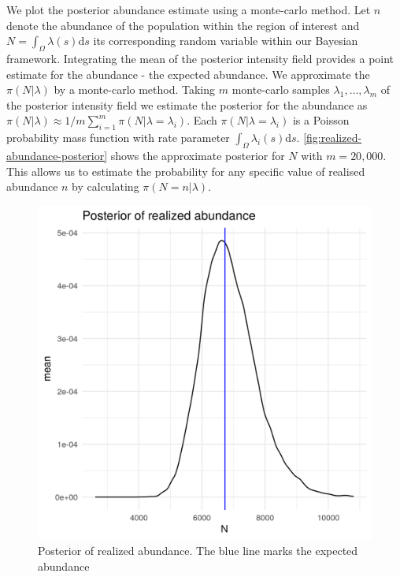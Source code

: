 \documentclass[preprint,12pt]{elsarticle}
\begin{document}
We plot the posterior abundance estimate using a monte-carlo method.  Let $n$ denote the abundance of the population within the region of interest and $N = \int_{\Omega}\lambda(s)\mathrm{d}s$ its corresponding random variable within our Bayesian framework.  Integrating the mean of the posterior intensity field provides a point estimate for the abundance - the expected abundance.  We approximate the $\pi(N | \lambda)$ by a monte-carlo method.  Taking $m$ monte-carlo samples  $\lambda_1, \ldots, \lambda_m$ of the posterior intensity field we estimate the posterior for the abundance as $\pi(N | \lambda) \approx 1 / m \sum_{i=1}^m \pi (N | \lambda = \lambda_i)$. Each $\pi(N | \lambda = \lambda_i)$ is a Poisson probability mass function with rate parameter $\int_{\Omega}\lambda_i(s)\mathrm{d}s$. \autoref{fig:realized-abundance-posterior} shows the approximate posterior for $N$ with $m = 20,000$.  This allows us to estimate the probability for any specific value of realised abundance $n$ by calculating $\pi(N = n | \lambda)$.
\begin{figure}
	\includegraphics[scale=0.6]{figures/realized_abundance_posterior.png}
	\caption{Posterior of realized abundance.  The blue line marks the expected abundance}
	\label{fig:realized-abundance-posterior}
\end{figure}
\end{document}
